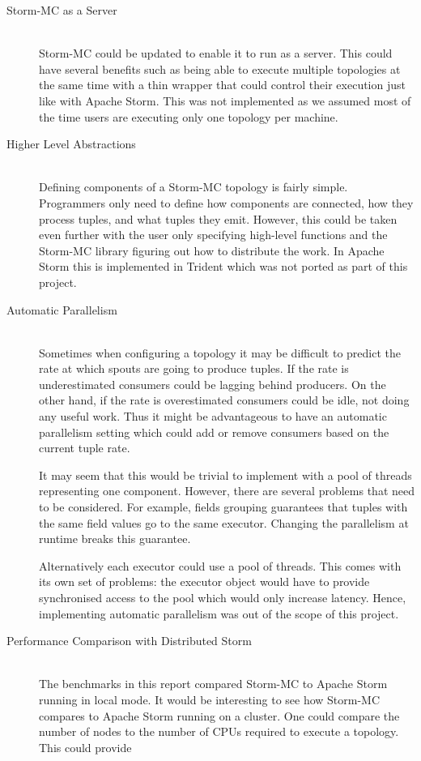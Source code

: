 \begin{description}
	\item[Storm-MC as a Server] \hfill \\
	Storm-MC could be updated to enable it to run as a server. This could have several benefits such as being able to execute multiple topologies at the same time with a thin wrapper that could control their execution just like with Apache Storm. This was not implemented as we assumed most of the time users are executing only one topology per machine.
	\item[Higher Level Abstractions] \hfill \\
	Defining components of a Storm-MC topology is fairly simple. Programmers only need to define how components are connected, how they process tuples, and what tuples they emit. However, this could be taken even further with the user only specifying high-level functions and the Storm-MC library figuring out how to distribute the work. In Apache Storm this is implemented in Trident which was not ported as part of this project.
	\item[Automatic Parallelism] \hfill \\
	Sometimes when configuring a topology it may be difficult to predict the rate at which spouts are going to produce tuples. If the rate is underestimated consumers could be lagging behind producers. On the other hand, if the rate is overestimated consumers could be idle, not doing any useful work. Thus it might be advantageous to have an automatic parallelism setting which could add or remove consumers based on the current tuple rate.
	
	It may seem that this would be trivial to implement with a pool of threads representing one component. However, there are several problems that need to be considered. For example, fields grouping guarantees that tuples with the same field values go to the same executor. Changing the parallelism at runtime breaks this guarantee.
	
	Alternatively each executor could use a pool of threads. This comes with its own set of problems: the executor object would have to provide synchronised access to the pool which would only increase latency. Hence, implementing automatic parallelism was out of the scope of this project.
	\item[Performance Comparison with Distributed Storm] \hfill \\
	The benchmarks in this report compared Storm-MC to Apache Storm running in local mode. It would be interesting to see how Storm-MC compares to Apache Storm running on a cluster. One could compare the number of nodes to the number of CPUs required to execute a topology. This could provide 
\end{description}
